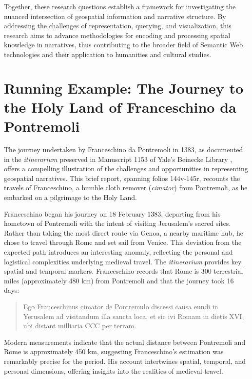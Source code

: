 Together, these research questions establish a framework for investigating the nuanced intersection of geospatial information and narrative structure. By addressing the challenges of representation, querying, and visualization, this research aims to advance methodologies for encoding and processing spatial knowledge in narratives, thus contributing to the broader field of Semantic Web technologies and their application to humanities and cultural studies.

\section{Running Example: The Journey to the Holy Land of Franceschino da Pontremoli}

The journey undertaken by Franceschino da Pontremoli in 1383, as documented in the \textit{itinerarium} preserved in Manuscript 1153 of Yale’s Beinecke Library \cite{YaleBeineckeLibrary}, offers a compelling illustration of the challenges and opportunities in representing geospatial narratives. This brief report, spanning folios 144v-145r, recounts the travels of Franceschino, a humble cloth remover (\textit{cimator}) from Pontremoli, as he embarked on a pilgrimage to the Holy Land. 

Franceschino began his journey on 18 February 1383, departing from his hometown of Pontremoli with the intent of visiting Jerusalem's sacred sites. Rather than taking the most direct route via Genoa, a nearby maritime hub, he chose to travel through Rome and set sail from Venice. This deviation from the expected path introduces an interesting anomaly, reflecting the personal and logistical complexities underlying medieval travel. The \textit{itinerarium} provides key spatial and temporal markers. Franceschino records that Rome is 300 terrestrial miles (approximately 480 km) from Pontremoli and that the journey took 16 days: 
\begin{quote}
Ego Franceschinus cimator de Pontremulo discessi causa eundi in Yerusalem ad visitandum illa sancta loca, et sic ivi Romam in dietis XVI, ubi distant milliaria CCC per terram.
\end{quote}

Modern measurements indicate that the actual distance between Pontremoli and Rome is approximately 450 km, suggesting Franceschino’s estimation was remarkably precise for the period. His account intertwines spatial, temporal, and personal dimensions, offering insights into the realities of medieval travel.


